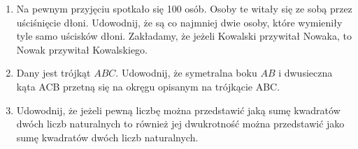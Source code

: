 \documentclass[10pt]{article}
\begin{document}
\begin{enumerate}
  \item Na pewnym przyjęciu spotkało się 100 osób. Osoby te witały się ze sobą przez uściśnięcie dłoni. Udowodnij, że są co najmniej dwie osoby, które wymieniły tyle samo uścisków dłoni. Zakładamy, że jeżeli Kowalski przywitał Nowaka, to Nowak przywitał Kowalskiego.
  \item Dany jest trójkąt \(A B C\). Udowodnij, że symetralna boku \(A B\) i dwusieczna kąta ACB przetną się na okręgu opisanym na trójkącie ABC.
  \item Udowodnij, że jeżeli pewną liczbę można przedstawić jaką sumę kwadratów dwóch liczb naturalnych to również jej dwukrotność można przedstawić jako sumę kwadratów dwóch liczb naturalnych.
\end{enumerate}
\end{document}
